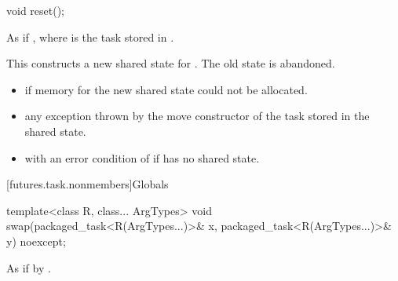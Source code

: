 %
\begin{itemdecl}
void reset();
\end{itemdecl}

\begin{itemdescr}
\pnum
\effects
As if , where
 is the task stored in
.
\begin{note}
This constructs a new shared state for . The
old state is abandoned.
\end{note}

\pnum
\throws
\begin{itemize}
\item {} if memory for the new shared state could not be allocated.
\item any exception thrown by the move constructor of the task stored in the shared
state.
\item {} with an error condition of  if 
has no shared state.
\end{itemize}
\end{itemdescr}

[futures.task.nonmembers]{Globals}

%
\begin{itemdecl}
template<class R, class... ArgTypes>
  void swap(packaged_task<R(ArgTypes...)>& x, packaged_task<R(ArgTypes...)>& y) noexcept;
\end{itemdecl}

\begin{itemdescr}
\pnum
\effects
As if by .
\end{itemdescr}
